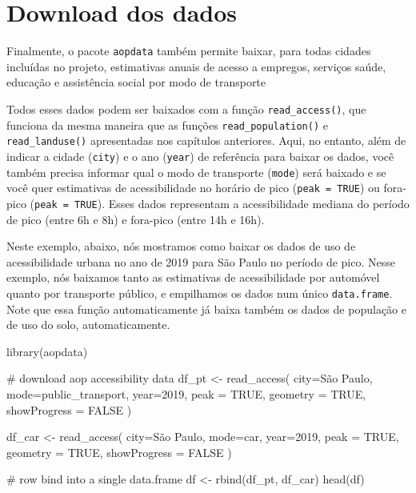 \documentclass[
  letterpaper,
  DIV=11,
  numbers=noendperiod]{scrreprt}
\newenvironment{Shaded}{\begin{snugshade}}{\end{snugshade}}
\newcommand{\AttributeTok}[1]{\textcolor[rgb]{0.40,0.45,0.13}{#1}}
\newcommand{\CommentTok}[1]{\textcolor[rgb]{0.37,0.37,0.37}{#1}}
\newcommand{\ConstantTok}[1]{\textcolor[rgb]{0.56,0.35,0.01}{#1}}
\newcommand{\DecValTok}[1]{\textcolor[rgb]{0.68,0.00,0.00}{#1}}
\newcommand{\FunctionTok}[1]{\textcolor[rgb]{0.28,0.35,0.67}{#1}}
\newcommand{\NormalTok}[1]{\textcolor[rgb]{0.00,0.23,0.31}{#1}}
\newcommand{\OtherTok}[1]{\textcolor[rgb]{0.00,0.23,0.31}{#1}}
\newcommand{\StringTok}[1]{\textcolor[rgb]{0.13,0.47,0.30}{#1}}
\begin{document}
\hypertarget{download-dos-dados-2}{%
\section{Download dos dados}\label{download-dos-dados-2}}

Finalmente, o pacote \texttt{aopdata} também permite baixar, para todas
cidades incluídas no projeto, estimativas anuais de acesso a empregos,
serviços saúde, educação e assistência social por modo de transporte

Todos esses dados podem ser baixados com a função
\texttt{read\_access()}, que funciona da mesma maneira que as funções
\texttt{read\_population()} e \texttt{read\_landuse()} apresentadas nos
capítulos anteriores. Aqui, no entanto, além de indicar a cidade
(\texttt{city}) e o ano (\texttt{year}) de referência para baixar os
dados, você também precisa informar qual o modo de transporte
(\texttt{mode}) será baixado e se você quer estimativas de
acessibilidade no horário de pico (\texttt{peak\ =\ TRUE}) ou fora-pico
(\texttt{peak\ =\ TRUE}). Esses dados representam a acessibilidade
mediana do período de pico (entre 6h e 8h) e fora-pico (entre 14h e
16h).

Neste exemplo, abaixo, nós mostramos como baixar os dados de uso de
acessibilidade urbana no ano de 2019 para São Paulo no período de pico.
Nesse exemplo, nós baixamos tanto as estimativas de acessibilidade por
automóvel quanto por transporte público, e empilhamos os dados num único
\texttt{data.frame}. Note que essa função automaticamente já baixa
também os dados de população e de uso do solo, automaticamente.

\begin{Shaded}
\begin{Highlighting}[]
\FunctionTok{library}\NormalTok{(aopdata)}

\CommentTok{\# download aop accessibility data}
\NormalTok{df\_pt }\OtherTok{\textless{}{-}} \FunctionTok{read\_access}\NormalTok{(}
  \AttributeTok{city=}\StringTok{\textquotesingle{}São Paulo\textquotesingle{}}\NormalTok{,}
  \AttributeTok{mode=}\StringTok{\textquotesingle{}public\_transport\textquotesingle{}}\NormalTok{,}
  \AttributeTok{year=}\DecValTok{2019}\NormalTok{,}
  \AttributeTok{peak =} \ConstantTok{TRUE}\NormalTok{,}
  \AttributeTok{geometry =} \ConstantTok{TRUE}\NormalTok{,}
  \AttributeTok{showProgress =} \ConstantTok{FALSE}
\NormalTok{)}

\NormalTok{df\_car }\OtherTok{\textless{}{-}} \FunctionTok{read\_access}\NormalTok{(}
  \AttributeTok{city=}\StringTok{\textquotesingle{}São Paulo\textquotesingle{}}\NormalTok{,}
  \AttributeTok{mode=}\StringTok{\textquotesingle{}car\textquotesingle{}}\NormalTok{,}
  \AttributeTok{year=}\DecValTok{2019}\NormalTok{,}
  \AttributeTok{peak =} \ConstantTok{TRUE}\NormalTok{,}
  \AttributeTok{geometry =} \ConstantTok{TRUE}\NormalTok{,}
  \AttributeTok{showProgress =} \ConstantTok{FALSE}
\NormalTok{)}

\CommentTok{\# row bind into a single data.frame}
\NormalTok{df }\OtherTok{\textless{}{-}} \FunctionTok{rbind}\NormalTok{(df\_pt, df\_car)}
\FunctionTok{head}\NormalTok{(df)}
\end{Highlighting}
\end{Shaded}
\end{document}
